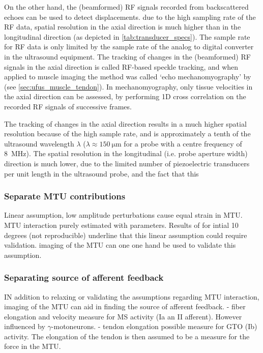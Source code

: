 On the other hand, the (beamformed) RF signals recorded from backscattered echoes can be used to detect displacements.  due to the high sampling rate of the RF data, spatial resolution in the axial direction is much higher than in the longitudinal direction (as depicted in \autoref{tab:transducer_specs}). The sample rate for RF data is only limited by the sample rate of the analog to digital converter in the ultrasound equipment. The tracking of changes in the (beamformed) RF signals in the axial direction is called RF-based speckle tracking, and when applied to muscle imaging the method was called `echo mechanomyography' by \citet{deffieux_assessment_2008}  (see \autoref{sec:ufus_muscle_tendon}). In mechanomyography, only tissue velocities in the axial direction can be assessed, by performing 1D cross correlation on the recorded RF signals of successive frames. 

The tracking of changes in the axial direction results in a much higher spatial resolution because of the high sample rate, and is approximately a tenth of the ultrasound wavelength $\lambda$ ($\lambda \approx \SI{150}{\micro\meter}$ for a probe with a centre frequency of \SI{8}{\mega\hertz}). The spatial resolution in the longitudinal (i.e. probe aperture width) direction is much lower, due to the limited number of piezoelectric transducers per unit length in the ultrasound probe, and the fact that this 





\subsubsection{Separate MTU contributions}
Linear assumption, low amplitude perturbations cause equal strain in MTU. MTU interaction purely estimated with parameters. Results of \citet{hauraix_shortening_2013} for intial 10 degrees (not reproducible) underline that this linear assumption could require validation. imaging of the MTU can one one hand be used to validate this assumption. 


\subsubsection{Separating source of afferent feedback}
IN addition to relaxing or validating the assumptions regarding MTU interaction, imaging of the MTU can aid in finding the source of afferent feedback. 
- fiber elongation and velocity measure for MS activity (Ia an II afferent). However influenced by $\gamma$-motoneurons. 
- tendon elongation possible measure for GTO (Ib) activity. The elongation of the tendon is then assumed to be a measure for the force in the MTU. 

